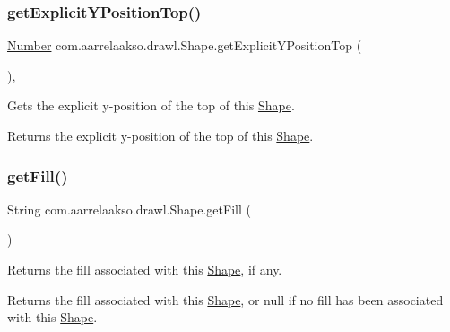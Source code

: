 \subsubsection{\texorpdfstring{get\+Explicit\+Y\+Position\+Top()}{getExplicitYPositionTop()}}
{\footnotesize\ttfamily \hyperlink{interfacecom_1_1aarrelaakso_1_1drawl_1_1_number}{Number} com.\+aarrelaakso.\+drawl.\+Shape.\+get\+Explicit\+Y\+Position\+Top (\begin{DoxyParamCaption}{ }\end{DoxyParamCaption})\hspace{0.3cm}{\ttfamily [protected]}, {\ttfamily [inherited]}}



Gets the explicit y-\/position of the top of this \hyperlink{classcom_1_1aarrelaakso_1_1drawl_1_1_shape}{Shape}. 

\begin{DoxyReturn}{Returns}
the explicit y-\/position of the top of this \hyperlink{classcom_1_1aarrelaakso_1_1drawl_1_1_shape}{Shape}. 
\end{DoxyReturn}
\mbox{\label{classcom_1_1aarrelaakso_1_1drawl_1_1_shape_a0d9a33a3e151aaceeec140bea343a650}} 
\subsubsection{\texorpdfstring{get\+Fill()}{getFill()}}
{\footnotesize\ttfamily String com.\+aarrelaakso.\+drawl.\+Shape.\+get\+Fill (\begin{DoxyParamCaption}{ }\end{DoxyParamCaption})\hspace{0.3cm}{\ttfamily [inherited]}}



Returns the fill associated with this \hyperlink{classcom_1_1aarrelaakso_1_1drawl_1_1_shape}{Shape}, if any. 

\begin{DoxyReturn}{Returns}
the fill associated with this \hyperlink{classcom_1_1aarrelaakso_1_1drawl_1_1_shape}{Shape}, or null if no fill has been associated with this \hyperlink{classcom_1_1aarrelaakso_1_1drawl_1_1_shape}{Shape}. 
\end{DoxyReturn}
\mbox{\label{classcom_1_1aarrelaakso_1_1drawl_1_1_shape_ac9f74d31c332aab76b329edc22080e67}} 
